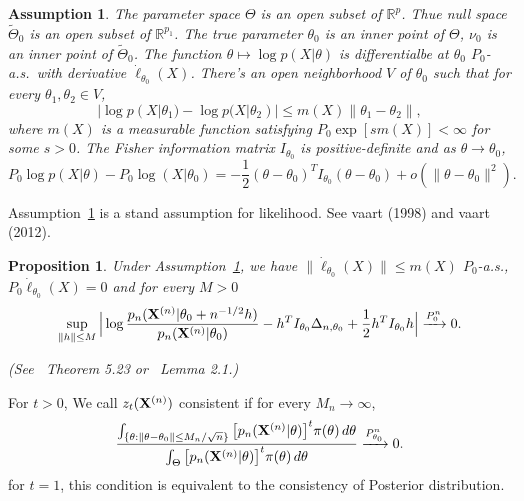 \documentclass[3p]{elsarticle}
\theoremstyle{plain}
\newtheorem{proposition}{\quad\quad Proposition}
\newtheorem{assumption}{\quad\quad Assumption}
\theoremstyle{definition}
\theoremstyle{remark}
\begin{document}
\begin{assumption}\label{Assumption1}
The parameter space $\Theta$ is an open subset of $\mathbb{R}^p$. 
    Thue null space $\tilde{\Theta}_0$ is an open subset of $\mathbb{R}^{p_1}$.
    The true parameter $\theta_0$ is an inner point of $\Theta$, $\nu_0$ is an inner point of $\tilde{\Theta}_0$.
The function $\theta \mapsto \log p(X|\theta)$ is differentialbe at $\theta_0$  $P_0$-a.s.\ with derivative $\dot{\ell}_{\theta_0}(X)$.
There's an open neighborhood $V$ of $\theta_0$ such that for every $\theta_1,\theta_2\in V$,
        \begin{equation*}
            |\log p(X|\theta_1)-\log p(X|\theta_2)|\leq m(X)\|\theta_1-\theta_2\|,
        \end{equation*}
        where $m(X)$ is a measurable function satisfying $P_{0}\exp[s m(X)]<\infty$ for some $s>0$.
The Fisher information matrix $I_{\theta_0}$ is positive-definite and as $\theta\to \theta_0$,
    \begin{equation*}
        P_0 \log p(X|\theta)- P_0 \log (X|\theta_0)
        =-\frac{1}{2}(\theta-\theta_0)^T I_{\theta_0} (\theta-\theta_0)+o(\|\theta-\theta_0\|^2).
    \end{equation*}
\end{assumption}     
Assumption~\ref{Assumption1} is a stand assumption for likelihood. See vaart (1998) and vaart (2012).
\begin{proposition}\label{Thm:localExpansion}
    Under Assumption~\ref{Assumption1},
    we have $\|\dot{\ell}_{\theta_0}(X)\|\leq m(X)$ $P_0$-a.s., $P_0 \dot{\ell}_{\theta_0}(X)=0$ and for every $M>0$
    \begin{equation*}
        \sup_{\|h\|\leq M}\Big|
         \log \frac{p_n(\mathbf{X}^{(n)}|\theta_0+n^{-1/2}h)}{p_n(\mathbf{X}^{(n)}|\theta_0)}-h^T I_{\theta_0}\Delta_{n,\theta_0}+\frac{1}{2}h^T I_{\theta_0}h
        \Big|\xrightarrow{P^n_0}0.
    \end{equation*}

    (See~\cite{van2000asymptotic} Theorem 5.23 or~\cite{Kleijn2012The} Lemma 2.1.)
\end{proposition}
    For $t>0$, We call $z_t(\mathbf{X}^{(n)})$ consistent if for every $M_n\to \infty$,
    $$
    \frac{\int_{\{\theta:\|\theta-\theta_0\|\leq M_n/\sqrt{n}\}}\big[ p_n(\mathbf{X}^{(n)}|\theta)\big]^t \pi(\theta)\, d\theta}{\int_{\Theta}\big[p_n(\mathbf{X}^{(n)}|\theta)\big]^t \pi(\theta)\, d\theta}\xrightarrow{P_{\theta_0}^n} 0.
    $$
    for $t=1$, this condition is equivalent to the consistency of Posterior distribution.
\end{document}
